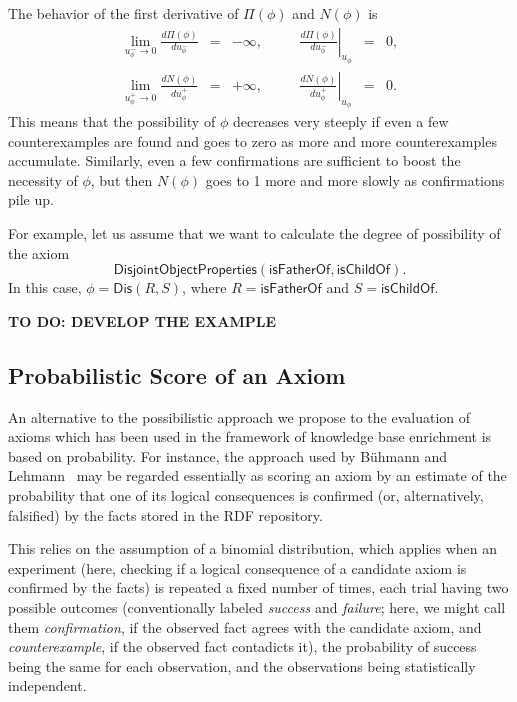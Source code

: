 \documentclass[a4paper]{article}
\newcounter{ex}
\begin{document}
The behavior of the first derivative of $\Pi(\phi)$ and $N(\phi)$ is
\[
  \begin{array}{rclcrcl}
    \displaystyle \lim_{u_\phi^-\to0}\frac{d\Pi(\phi)}{du_\phi^-} &=& -\infty, &\quad&
    \left.\frac{d\Pi(\phi)}{du_\phi^-}\right|_{u_\phi} &=& 0, \\
    \displaystyle \lim_{u_\phi^+\to0}\frac{dN(\phi)}{du_\phi^+} &=& +\infty, &\quad&
    \left.\frac{dN(\phi)}{du_\phi^+}\right|_{u_\phi} &=& 0.
  \end{array}
\]
This means that the possibility of $\phi$ decreases very steeply if even a few
counterexamples are found and goes to zero as more and more counterexamples
accumulate. Similarly, even a few confirmations are sufficient to boost the
necessity of $\phi$, but then $N(\phi)$ goes to 1 more and more slowly as
confirmations pile up.

For example, let us assume that we want to calculate the degree of possibility of the axiom
\[
  \mathsf{DisjointObjectProperties}(\mathsf{isFatherOf}, \mathsf{isChildOf}).
\]
In this case, $\phi = \mathsf{Dis}(R, S)$, where $R = \mathsf{isFatherOf}$ and
$S = \mathsf{isChildOf}$.

\textbf{TO DO: DEVELOP THE EXAMPLE}

\subsection{Probabilistic Score of an Axiom}

An alternative to the possibilistic approach we propose to the evaluation of axioms
which has been used in the framework of knowledge base enrichment is based on probability.
For instance, the approach used by B\"uhmann and Lehmann~\cite{BuehmannLehmann2012}
may be regarded essentially as scoring an axiom by an estimate of the probability
that one of its logical consequences is confirmed (or, alternatively, falsified)
by the facts stored in the RDF repository.

This relies on the assumption of a binomial distribution, which applies when an
experiment (here, checking if a logical consequence of a candidate axiom is confirmed
by the facts) is repeated a fixed number of times, each trial having two possible outcomes
(conventionally labeled \emph{success} and \emph{failure}; here, we might call them
\emph{confirmation}, if the observed fact agrees with the candidate axiom,
and \emph{counterexample}, if the observed fact contadicts it),
the probability of success being the same for each observation,
and the observations being statistically independent.
\end{document}

